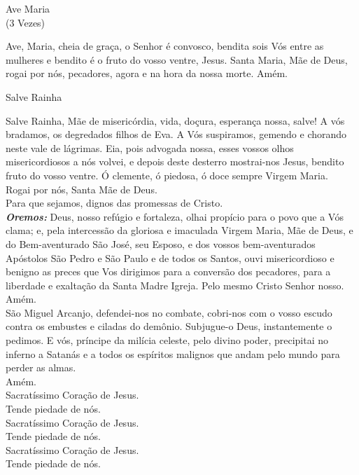 \documentclass{book}
\begin{document}
\newpage
\begin{center}
    Ave Maria \\ \textcolor{VioletRed2}{\scriptsize{(3 Vezes)}}
\end{center}
\begin{flushleft}
    Ave, Maria, cheia de graça, o Senhor é convosco, bendita sois Vós entre as mulheres e bendito é o fruto do vosso ventre, Jesus. Santa Maria, Mãe de Deus, rogai por nós, pecadores, agora e na hora da nossa morte. Amém.
\end{flushleft}
\begin{center}
    Salve Rainha
\end{center}
\begin{flushleft}
    Salve Rainha, Mãe de misericórdia, vida, doçura, esperança nossa, salve! A vós bradamos, os degredados filhos de Eva. A Vós suspiramos, gemendo e chorando neste vale de lágrimas. Eia, pois advogada nossa, esses vossos olhos misericordiosos a nós volvei, e depois deste desterro mostrai-nos Jesus, bendito fruto do vosso ventre. Ó clemente, ó piedosa, ó doce sempre Virgem Maria.
    \vspace{.2cm} \\
    \VbarRed{} Rogai por nós, Santa Mãe de Deus. \\
    \RbarRed{} Para que sejamos, dignos das promessas de Cristo.
    \vspace{.2cm} \\
    \textbf{\textit{Oremos:}} Deus, nosso refúgio e fortaleza, olhai propício para o povo que a Vós clama; e, pela intercessão da gloriosa e imaculada Virgem Maria, Mãe de Deus, e do Bem-aventurado São José, seu Esposo, e dos vossos bem-aventurados Apóstolos São Pedro e São Paulo e de todos os Santos, ouvi misericordioso e benigno as preces que Vos dirigimos para a conversão dos pecadores, para a liberdade e exaltação da Santa Madre Igreja. Pelo mesmo Cristo Senhor nosso.
    \vspace{.2cm} \\
    \RbarRed{} Amém.
    \vspace{.2cm} \\
    São Miguel Arcanjo, defendei-nos no combate, cobri-nos com o vosso escudo contra os embustes e ciladas do demônio. Subjugue-o Deus, instantemente o pedimos. E vós, príncipe da milícia celeste, pelo divino poder, precipitai no inferno a Satanás e a todos os espíritos malignos que andam pelo mundo para perder as almas.
    \vspace{.2cm} \\
    \RbarRed{} Amém.
    \vspace{.2cm} \\
    \VbarRed{} Sacratíssimo Coração de Jesus. \\
    \RbarRed{} Tende piedade de nós. \\
    \VbarRed{} Sacratíssimo Coração de Jesus. \\
    \RbarRed{} Tende piedade de nós. \\
    \VbarRed{} Sacratíssimo Coração de Jesus. \\
    \RbarRed{} Tende piedade de nós.
\end{flushleft}
\end{document}
